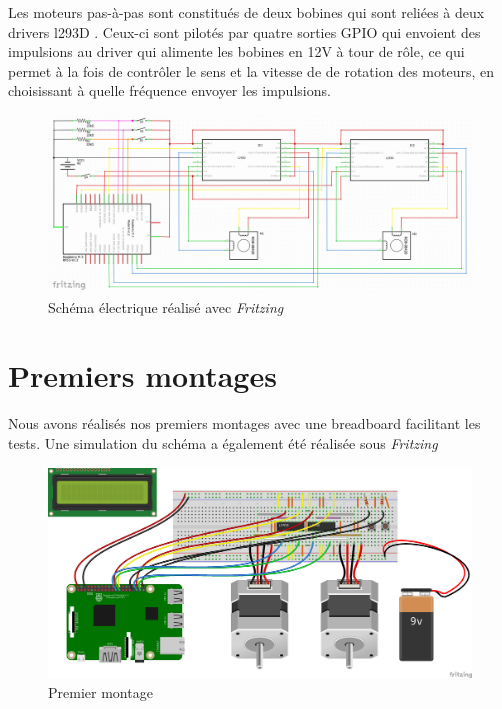 \documentclass[12pt,a4paper]{report}
\begin{document}
Les moteurs pas-à-pas sont constitués de deux bobines qui sont reliées à deux drivers l293D . Ceux-ci sont pilotés par quatre sorties GPIO qui envoient des impulsions au driver qui alimente les bobines en 12V à tour de rôle, ce qui permet à la fois de contrôler le sens et la vitesse de de rotation des moteurs, en choisissant à quelle fréquence envoyer les impulsions.
\begin{figure}[!h]
 \center
 \includegraphics[scale=0.34]{../pictures/Sudoku_schema_electrique.png}
 \caption{Schéma électrique réalisé avec \emph{Fritzing}}
\end{figure}

\section{Premiers montages}
Nous avons réalisés nos premiers montages avec une breadboard facilitant les tests. Une simulation du schéma a également été réalisée sous \emph{Fritzing}


\begin{figure}[!h]
 \center
 \includegraphics[scale=0.45]{../pictures/Sudoku_schema}
 \caption{Premier montage}
\end{figure}
\end{document}
